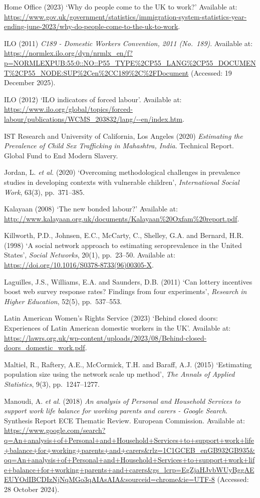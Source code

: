 \documentclass[
  12pt,
  letterpaper,
  DIV=11,
  numbers=noendperiod]{scrartcl}
\begin{document}
Home Office (2023) `Why do people come to the UK to work?' Available at:
\url{https://www.gov.uk/government/statistics/immigration-system-statistics-year-ending-june-2023/why-do-people-come-to-the-uk-to-work}.

ILO (2011) \emph{C189 - Domestic Workers Convention, 2011 (No.~189)}.
Available at:
\url{https://normlex.ilo.org/dyn/nrmlx_en/f?p=NORMLEXPUB:55:0::NO::P55_TYPE\%2CP55_LANG\%2CP55_DOCUMENT\%2CP55_NODE:SUP\%2Cen\%2CC189\%2C\%2FDocument}
(Accessed: 19 December 2025).

ILO (2012) `ILO indicators of forced labour'. Available at:
\url{https://www.ilo.org/global/topics/forced-labour/publications/WCMS_203832/lang/--en/index.htm}.

IST Research and University of California, Los Angeles (2020)
\emph{Estimating the Prevalence of Child Sex Trafficking in Mahashtra,
India}. Technical Report. Global Fund to End Modern Slavery.

Jordan, L. \emph{et al.} (2020) `Overcoming methodological challenges in
prevalence studies in developing contexts with vulnerable children',
\emph{International Social Work}, 63(3), pp.~371--385.

Kalayaan (2008) `The new bonded labour?' Available at:
\url{http://www.kalayaan.org.uk/documents/Kalayaan\%20Oxfam\%20report.pdf}.

Killworth, P.D., Johnsen, E.C., McCarty, C., Shelley, G.A. and Bernard,
H.R. (1998) `A social network approach to estimating seroprevalence in
the United States', \emph{Social Networks}, 20(1), pp.~23--50. Available
at: \url{https://doi.org/10.1016/S0378-8733(96)00305-X}.

Laguilles, J.S., Williams, E.A. and Saunders, D.B. (2011) `Can lottery
incentives boost web survey response rates? Findings from four
experiments', \emph{Research in Higher Education}, 52(5), pp.~537--553.

Latin American Women's Rights Service (2023) `Behind closed doors:
Experiences of Latin American domestic workers in the UK'. Available at:
\url{https://lawrs.org.uk/wp-content/uploads/2023/08/Behind-closed-doors_domestic_work.pdf}.

Maltiel, R., Raftery, A.E., McCormick, T.H. and Baraff, A.J. (2015)
`Estimating population size using the network scale up method',
\emph{The Annals of Applied Statistics}, 9(3), pp.~1247--1277.

Manoudi, A. \emph{et al.} (2018) \emph{An analysis of Personal and
Household Services to support work life balance for working parents and
carers - Google Search}. Synthesis Report ECE Thematic Review. European
Commission. Available at:
\url{https://www.google.com/search?q=An+analysis+of+Personal+and+Household+Services+to+support+work+life+balance+for+working+parents+and+carers&rlz=1C1GCEB_enGB932GB935&oq=An+analysis+of+Personal+and+Household+Services+to+support+work+life+balance+for+working+parents+and+carers&gs_lcrp=EgZjaHJvbWUyBggAEEUYOdIBCDIzNjNqMGo3qAIAsAIA&sourceid=chrome&ie=UTF-8}
(Accessed: 28 October 2024).
\end{document}
